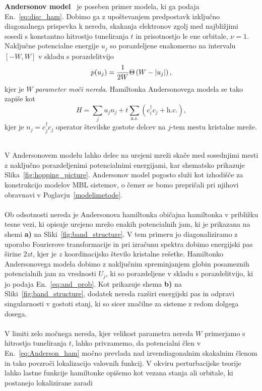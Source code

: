 \textbf{Andersonov model}~\cite{anderson1958absence} je poseben primer modela, ki ga podaja En.~\eqref{eq:disc_ham}. Dobimo ga z upoštevanjem predpostavk izključno diagonalnega prispevka k neredu, skakanja elektronov zgolj med najbližjimi sosedi s konstantno hitrostjo tuneliranja $t$ in prisotnostjo le ene orbitale, $\nu=1$. Naključne potencialne energije $u_j$ so porazdeljene enakomerno na intervalu $\left[-W,W\right]$ v skladu s porazdelitvijo
\begin{equation}\label{eq:and_prob}
p(u_j)= \frac{1}{2W}\Theta \left(W - \left| u_j \right| \right),
\end{equation}
kjer je $W$ \emph{parameter moči nereda}. Hamiltonka Andersonovega modela se tako zapiše kot 
\begin{equation}\label{eq:Anderson_ham}
H=\sum\limits_j u_j n_j + t\sum\limits_{\mathrm{n. s.}}\left(c^\dagger_i c_j + \mathrm{h.c.}\right),
\end{equation}
kjer je $n_j=c^\dagger_jc_j$ operator številske gostote delcev na $j$-tem mestu kristalne mreže.\\\\
\begin{minipage}[t]{0.55\textwidth}
V Andersonovem modelu lahko delec na urejeni mreži skače med sosednjimi mesti z naključno porazdeljenimi potencialnimi energijami, kar shematsko prikazuje Slika~\ref{fig:hopping_picture}. Andersonov model pogosto služi kot izhodišče za konstrukcijo modelov MBL sistemov, o čemer se bomo prepričali pri njihovi obravnavi v Poglavju~\ref{modelimetode}.\\\\
Ob odsotnosti nereda je Andersonova hamiltonka običajna hamiltonka v približku tesne vezi, ki opisuje urejeno mrežo enakih potencialnih jam, ki je prikazana na shemi \textbf{a)} na Sliki~\ref{fig:band_structure}.  V tem primeru jo diagonaliziramo z uporabo Fourierove transformacije in pri izračunu spektra dobimo energijski pas širine $2zt$, kjer je $z$ koordinacijsko število kristalne rešetke. Hamiltonko Andersonovega modela dobimo z naključnim spreminjanjem globin posameznih potencialnih jam za vrednosti $U_j$, ki so porazdeljene v skladu s porazdelitvijo, ki jo podaja En.~\eqref{eq:and_prob}. Kot prikazuje shema \textbf{b)} na Sliki~\ref{fig:band_structure}, dodatek nereda razširi energijski pas in odpravi singularnosti v gostoti stanj, ki so sicer značilne za sisteme z redom dolgega dosega. \\\\
V limiti zelo močnega nereda, kjer velikost parametra nereda $W$ primerjamo s hitrostjo tuneliranja $t$, lahko privzamemo, da potencialni člen v En.~\eqref{eq:Anderson_ham} močno prevlada nad izvendiagonalnim skakalnim členom in tako povzroči lokalizacijo valovnih funkcij. V okviru perturbacijske teorije lahko lastne funkcije hamiltonke opišemo kot vezana stanja ali orbitale, ki postanejo lokalizirane zaradi 
\end{minipage}\hfill
